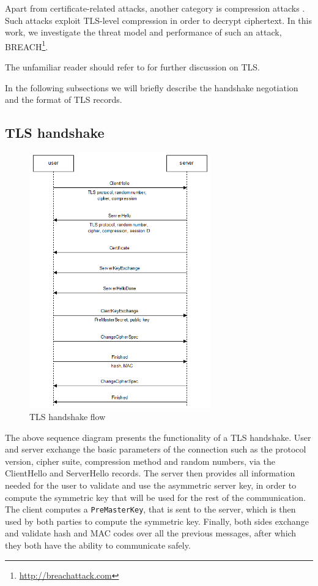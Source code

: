 Apart from certificate-related attacks, another category is compression attacks
\cite{compression_attacks}. Such attacks exploit TLS-level compression in order
to decrypt ciphertext. In this work, we investigate the threat model and
performance of such an attack, BREACH\footnote{\url{http://breachattack.com}}.

The unfamiliar reader should refer to \cite{tls12} for further discussion on
TLS.

In the following subsections we will briefly describe the handshake negotiation
and the format of TLS records.

\subsection{TLS handshake}

\begin{figure}[H] \caption{TLS handshake flow} \centering
\includegraphics[width=0.7\textwidth]{diagrams/tls_handshake.png}\end{figure}

The above sequence diagram presents the functionality of a TLS handshake. User and
server exchange the basic parameters of the connection such as the protocol
version, cipher suite, compression method and random numbers, via the
ClientHello and ServerHello records. The server then provides all information
needed for the user to validate and use the asymmetric server key, in order
to compute the symmetric key that will be used for the rest of the
communication. The client computes a \texttt{PreMasterKey}, that is sent to the
server, which is then used by both parties to compute the symmetric key.
Finally, both sides exchange and validate hash and MAC codes over all the
previous messages, after which they both have the ability to communicate safely.

